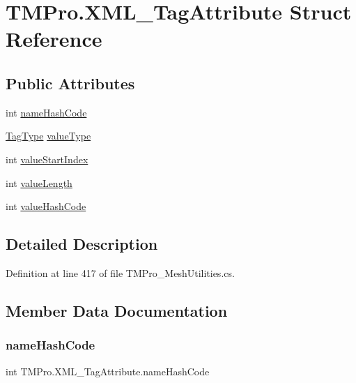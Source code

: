 \hypertarget{struct_t_m_pro_1_1_x_m_l___tag_attribute}{}\section{T\+M\+Pro.\+X\+M\+L\+\_\+\+Tag\+Attribute Struct Reference}
\label{struct_t_m_pro_1_1_x_m_l___tag_attribute}
\subsection*{Public Attributes}
\begin{DoxyCompactItemize}
\item 
int \mbox{\hyperlink{struct_t_m_pro_1_1_x_m_l___tag_attribute_afb0f35ea44d24afcc67216eef3078cbe}{name\+Hash\+Code}}
\item 
\mbox{\hyperlink{namespace_t_m_pro_a3a02df19cfabd98e98ddde29b9c3cbde}{Tag\+Type}} \mbox{\hyperlink{struct_t_m_pro_1_1_x_m_l___tag_attribute_a5959a81be64a0d39cbfcc277bb9abf64}{value\+Type}}
\item 
int \mbox{\hyperlink{struct_t_m_pro_1_1_x_m_l___tag_attribute_a66940ac684ba970cb1dc54314a686524}{value\+Start\+Index}}
\item 
int \mbox{\hyperlink{struct_t_m_pro_1_1_x_m_l___tag_attribute_a6f34645b5fa09f572ca16b1b2a8e0c02}{value\+Length}}
\item 
int \mbox{\hyperlink{struct_t_m_pro_1_1_x_m_l___tag_attribute_a398ab6134f84bd362cf265e423ea6718}{value\+Hash\+Code}}
\end{DoxyCompactItemize}


\subsection{Detailed Description}


Definition at line 417 of file T\+M\+Pro\+\_\+\+Mesh\+Utilities.\+cs.



\subsection{Member Data Documentation}
\mbox{\label{struct_t_m_pro_1_1_x_m_l___tag_attribute_afb0f35ea44d24afcc67216eef3078cbe}} 
\subsubsection{\texorpdfstring{nameHashCode}{nameHashCode}}
{\footnotesize\ttfamily int T\+M\+Pro.\+X\+M\+L\+\_\+\+Tag\+Attribute.\+name\+Hash\+Code}



